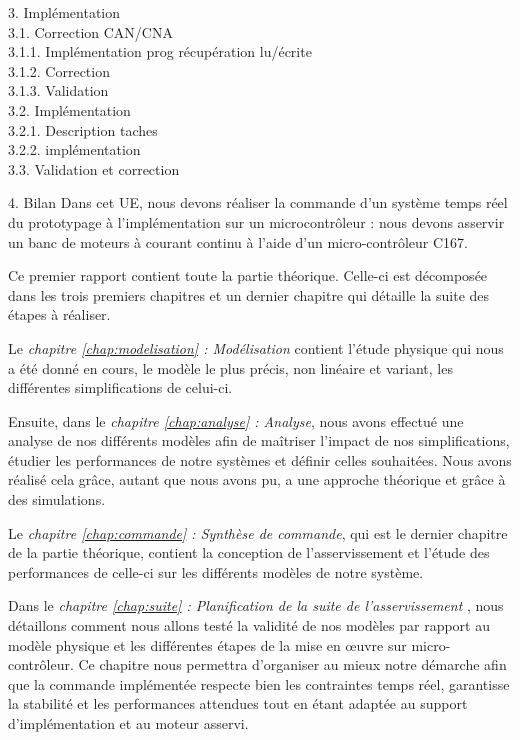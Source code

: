 3. Implémentation \\
	3.1. Correction CAN/CNA\\
		3.1.1. Implémentation prog récupération lu/écrite\\
		3.1.2. Correction \\
		3.1.3. Validation \\
	3.2. Implémentation \\
		3.2.1. Description taches\\
		3.2.2. implémentation\\
	3.3. Validation et correction 

4. Bilan 
Dans cet UE, nous devons réaliser la commande d’un système temps réel du prototypage à l'implémentation sur un microcontrôleur : nous devons asservir un banc de moteurs à courant continu à l'aide d'un micro-contrôleur C167. 

Ce premier rapport contient toute la partie théorique. Celle-ci est décomposée dans les trois premiers chapitres et un dernier chapitre qui détaille la suite des étapes à réaliser.

Le \emph{chapitre \ref{chap:modelisation} : Modélisation} contient l'étude physique qui nous a été donné en cours, le modèle le plus précis, non linéaire et variant, les différentes simplifications de celui-ci. 

Ensuite, dans le \emph{chapitre \ref{chap:analyse} : Analyse}, nous avons effectué une analyse de nos différents modèles afin de maîtriser l’impact de nos simplifications, étudier les performances de notre systèmes et définir celles souhaitées. Nous avons réalisé cela grâce, autant que nous avons pu, a une approche théorique et grâce à des simulations.

Le \emph{chapitre \ref{chap:commande} : Synthèse de commande}, qui est le dernier chapitre de la partie théorique, contient la conception de l'asservissement et l'étude des performances de celle-ci sur les différents modèles de notre système.
 
Dans le \emph{chapitre \ref{chap:suite} : Planification de la suite de l'asservissement }, nous détaillons comment nous allons testé la validité de nos modèles par rapport au modèle physique et les différentes étapes de la mise en \oe uvre sur micro-contrôleur. Ce chapitre nous permettra d'organiser au mieux notre démarche afin que la commande implémentée respecte bien les contraintes temps réel, garantisse la stabilité et les performances attendues tout en étant adaptée au support d'implémentation et au moteur asservi.

